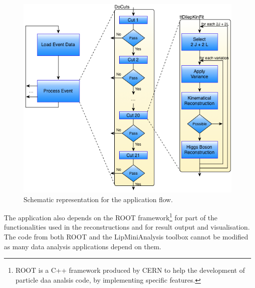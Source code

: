 \begin{figure}[!htp]
	\begin{center}
		\includegraphics[scale=0.5]{images/graf_abstract_flow_with_kinfit.png}
		\caption{Schematic representation for the \tth application flow.}
		\label{fig:flow}
	\end{center}
\end{figure}

The application also depends on the ROOT framework\footnote{ROOT \cite{ROOT} is a C++ framework produced by CERN  to help the development of particle daa analsis code, by implementing specific features.} for part of the functionalities used in the reconstructions and for result output and visualisation. The code from both ROOT and the LipMiniAnalysis toolbox cannot be modified as many data analysis applications depend on them.
